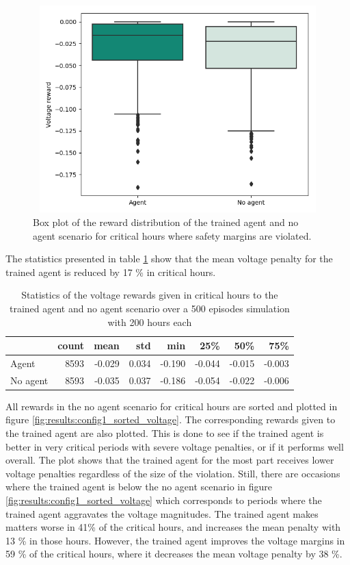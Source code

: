 \documentclass[class=book, crop=false, 11pt]{standalone}
\begin{document}
\begin{figure}[H]
    \center
\includegraphics[height=8cm, width=12cm]{figures/config1_voltage_boxplot.png}
    \caption[size = 9]{Box plot of the reward distribution of the trained agent and no agent scenario for critical hours where safety margins are violated.}
    \label{fig:results:config1_voltage_boxplot}
\end{figure}

The statistics presented in table \ref{table:results:configuration1_reward_500_ep_preventive} show that the mean voltage penalty for the trained agent is reduced by 17 \% in critical hours.


\begin{table}[h]
\center
\caption{Statistics of the voltage rewards given in critical hours to the trained agent and no agent scenario over a 500 episodes simulation with 200 hours each}
\begin{tabular}{l|rrrrrrr}
         & count & mean   & std   & min    & 25\%   & 50\%   & 75\%   \\
\hline
Agent    & 8593 & -0.029 & 0.034 & -0.190 & -0.044 & -0.015 & -0.003 \\
No agent & 8593 & -0.035 & 0.037 & -0.186 & -0.054 & -0.022 & -0.006 \\
\hline
\end{tabular}
\label{table:results:configuration1_reward_500_ep_preventive}
\end{table}



All rewards in the no agent scenario for critical hours are sorted and plotted in figure \ref{fig:results:config1_sorted_voltage}. The corresponding rewards given to the trained agent are also plotted. This is done to see if the trained agent is better in very critical periods with severe voltage penalties, or if it performs well overall. The plot shows that the trained agent for the most part receives lower voltage penalties regardless of the size of the violation. Still, there are occasions where the trained agent is below the no agent scenario in figure \ref{fig:results:config1_sorted_voltage} which corresponds to periods where the trained agent aggravates the voltage magnitudes. The trained agent makes matters worse in 41\% of the critical hours, and increases the mean penalty with 13 \% in those hours. However, the trained agent improves the voltage margins in 59 \% of the critical hours, where it decreases the mean voltage penalty by 38 \%.
\end{document}
